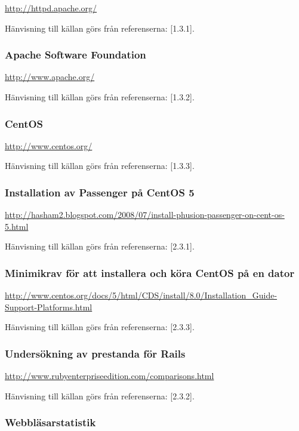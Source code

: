 \documentclass[a4paper, twoside, 11pt, titlepage]{article}
\begin{document}
		\url{http://httpd.apache.org/}

		Hänvisning till källan görs från referenserna: [1.3.1].

		\subsubsection{Apache Software Foundation}


		\url{http://www.apache.org/}

		Hänvisning till källan görs från referenserna: [1.3.2].

		\subsubsection{CentOS}


		\url{http://www.centos.org/}

		Hänvisning till källan görs från referenserna: [1.3.3].

		\subsubsection{Installation av Passenger på CentOS 5}


		\url{http://hasham2.blogspot.com/2008/07/install-phusion-passenger-on-cent-os-5.html}

		Hänvisning till källan görs från referenserna: [2.3.1].

		\subsubsection{Minimikrav för att installera och köra CentOS på en dator}


		\url{http://www.centos.org/docs/5/html/CDS/install/8.0/Installation_Guide-Support-Platforms.html}

		Hänvisning till källan görs från referenserna: [2.3.3].

		\subsubsection{Undersökning av prestanda för Rails}


		\url{http://www.rubyenterpriseedition.com/comparisons.html}

		Hänvisning till källan görs från referenserna: [2.3.2].

		\subsubsection{Webbläsarstatistik}
\end{document}
